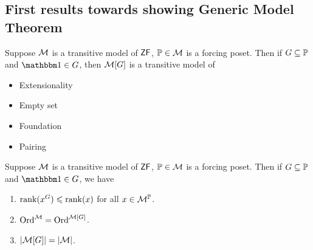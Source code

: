 \documentclass{article}
\begin{document}
\subsection{First results towards showing Generic Model Theorem}
\begin{fancylem}{}
    Suppose $\mathcal{M}$ is a transitive model of $\mathsf{ZF}$, $\mathbb{P} \in \mathcal{M}$ is a forcing poset. Then if $G \subseteq \mathbb{P}$ and $\bbone \in G$, then $\mathcal{M}[G]$ is a transitive model of \begin{itemize}
        \item Extensionality
        \item Empty set
        \item Foundation
        \item Pairing
    \end{itemize}
\end{fancylem}
\newlec
\begin{fancylem}
    Suppose $\mathcal{M}$ is a transitive model of $\mathsf{ZF}$, $\mathbb{P} \in \mathcal{M}$ is a forcing poset. Then if $G \subseteq \mathbb{P}$ and $\bbone \in G$, we have \begin{enumerate}
        \item[(i)] $\rank(x^{G}) \leqslant \rank(x)$ for all $x \in \mathcal{M}^{\mathbb{P}}$.
        \item[(ii)] $\operatorname{Ord}^{\mathcal{M}} = \operatorname{Ord}^{\mathcal{M}[G]}$.
        \item[(iii)] $|\mathcal{M}[G]| = |\mathcal{M}|$.
    \end{enumerate}
\end{fancylem}
\end{document}
